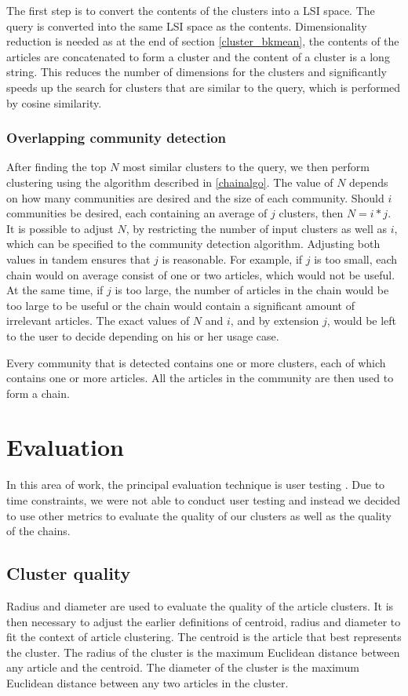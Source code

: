\documentclass[12pt]{article}
\begin{document}
The first step is to convert the contents of the clusters into a LSI space. The query is converted into the same LSI space as the contents. Dimensionality reduction is needed as at the end of section \ref{cluster_bkmean}, the contents of the articles are concatenated to form a cluster and the content of a cluster is a long string. This reduces the number of dimensions for the clusters and significantly speeds up the search for clusters that are similar to the query, which is performed by cosine similarity.

\subsubsection{Overlapping community detection} \label{overlapcom}
After finding the top $N$ most similar clusters to the query, we then perform clustering using the algorithm described in \ref{chainalgo}. The value of $N$ depends on how many communities are desired and the size of each community. Should $i$ communities be desired, each containing an average of $j$ clusters, then $N = i * j$. It is possible to adjust $N$, by restricting the number of input clusters as well as $i$, which can be specified to the community detection algorithm. Adjusting both values in tandem ensures that $j$ is reasonable. For example, if $j$ is too small, each chain would on average consist of one or two articles, which would not be useful. At the same time, if $j$ is too large, the number of articles in the chain would be too large to be useful or the chain would contain a significant amount of irrelevant articles. The exact values of $N$ and $i$, and by extension $j$, would be left to the user to decide depending on his or her usage case.

Every community that is detected contains one or more clusters, each of which contains one or more articles. All the articles in the community are then used to form a chain.

\section{Evaluation}
In this area of work, the principal evaluation technique is user testing \cite{newsblaster, infocartography, connectingdots, eventthreading, informationmaps}. Due to time constraints, we were not able to conduct user testing and instead we decided to use other metrics to evaluate the quality of our clusters as well as the quality of the chains.

\subsection{Cluster quality}
Radius and diameter are used to evaluate the quality of the article clusters. It is then necessary to adjust the earlier definitions of centroid, radius and diameter to fit the context of article clustering. The centroid is the article that best represents the cluster. The radius of the cluster is the maximum Euclidean distance between any article and the centroid. The diameter of the cluster is the maximum Euclidean distance between any two articles in the cluster.
\end{document}
